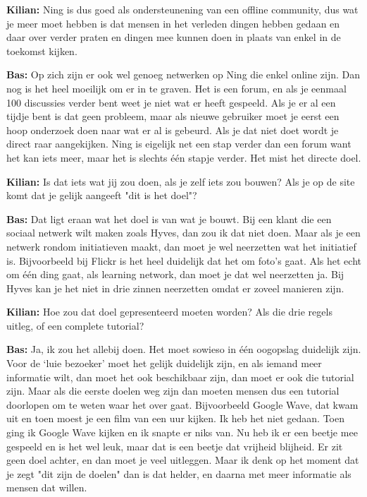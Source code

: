 \textbf{Kilian:} Ning is dus goed als ondersteunening van een offline community, dus wat je meer moet hebben is dat mensen in het verleden dingen hebben gedaan en daar over verder praten en dingen mee kunnen doen in plaats van enkel in de toekomst kijken.

\textbf{Bas:} Op zich zijn er ook wel genoeg netwerken op Ning die enkel online zijn. Dan nog is het heel moeilijk om er in te graven. Het is een forum, en als je eenmaal 100 discussies verder bent weet je niet wat er heeft gespeeld. Als je er al een tijdje bent is dat geen probleem, maar als nieuwe gebruiker moet je eerst een hoop onderzoek doen naar wat er al is gebeurd. Als je dat niet doet wordt je direct raar aangekijken. Ning is eigelijk net een stap verder dan een forum want het kan iets meer, maar het is slechts \'e\'en stapje verder. Het mist het directe doel.

\textbf{Kilian:} Is dat iets wat jij zou doen, als je zelf iets zou bouwen? Als je op de site komt dat je gelijk aangeeft "dit is het doel"?

\textbf{Bas:} Dat ligt eraan wat het doel is van wat je bouwt. Bij een klant die een sociaal netwerk wilt maken zoals Hyves, dan zou ik dat niet doen. Maar als je een netwerk rondom initiatieven maakt, dan moet je wel neerzetten wat het initiatief is. Bijvoorbeeld bij Flickr is het heel duidelijk dat het om foto's gaat. Als het echt om \'e\'en ding gaat, als learning network, dan moet je dat wel neerzetten ja. Bij Hyves kan je het niet in drie zinnen neerzetten omdat er zoveel manieren zijn.

\textbf{Kilian:} Hoe zou dat doel gepresenteerd moeten worden? Als die drie regels uitleg, of een complete tutorial?

\textbf{Bas:} Ja, ik zou het allebij doen. Het moet sowieso in \'e\'en oogopslag duidelijk zijn. Voor de `luie bezoeker' moet het gelijk duidelijk zijn, en als iemand meer informatie wilt, dan moet het ook beschikbaar zijn, dan moet er ook die tutorial zijn. Maar als die eerste doelen weg zijn dan moeten mensen dus een tutorial doorlopen om te weten waar het over gaat. Bijvoorbeeld Google Wave, dat kwam uit en toen moest je een film van een uur kijken. Ik heb het niet gedaan. Toen ging ik Google Wave kijken en ik snapte er niks van. Nu heb ik er een beetje mee gespeeld en is het wel leuk, maar dat is een beetje dat vrijheid blijheid. Er zit geen doel achter, en dan moet je veel uitleggen. Maar ik denk op het moment dat je zegt "dit zijn de doelen" dan is dat helder, en daarna met meer informatie als mensen dat willen.

